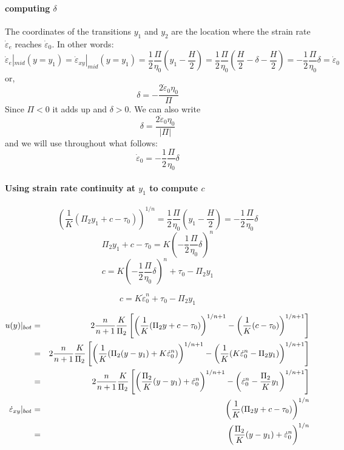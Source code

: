 \paragraph{computing $\delta$}

The coordinates of the transitions $y_1$ and $y_2$ are the location where the strain rate
$\dot{\varepsilon}_e$ reaches $\dot{\varepsilon}_0$. In other words:
\[
\dot{\varepsilon}_{e}|_{mid}(y=y_1) = 
\dot{\varepsilon}_{xy}|_{mid}(y=y_1)  
= \frac{1}{2} \frac{\Pi}{\eta_0} \left(y_1  -\frac{H}{2} \right)
= \frac{1}{2} \frac{\Pi}{\eta_0} \left(\frac{H}{2}-\delta  -\frac{H}{2} \right)
= -\frac{1}{2} \frac{\Pi}{\eta_0} \delta
= \dot{\varepsilon}_0
\]
or, 
\[
\delta = -\frac{2 \dot{\varepsilon}_0 \eta_0}{\Pi}
\]
Since $\Pi<0$ it adds up and $\delta>0$. We can also write
\[
\boxed{
\delta = \frac{2 \dot{\varepsilon}_0 \eta_0}{|\Pi|}
}
\]
and we will use throughout what follows:
\[
\dot{\varepsilon}_0 = - \frac{1}{2}\frac{\Pi}{\eta_0} \delta
\]


\paragraph{Using strain rate continuity at $y_1$ to compute $c$}
\[
\left( \frac{1}{K} ( \Pi_2 y_1 +c -\tau_0 ) \right)^{1/n}
= \frac{1}{2} \frac{\Pi}{\eta_0} \left(y_1  -\frac{H}{2} \right)
=- \frac{1}{2} \frac{\Pi}{\eta_0} \delta
\]
\[
 \Pi_2 y_1 +c -\tau_0 
= K\left( - \frac{1}{2} \frac{\Pi}{\eta_0} \delta\right)^{n}
\]
\[
c = K\left( - \frac{1}{2} \frac{\Pi}{\eta_0} \delta\right)^{n} + \tau_0 -\Pi_2 y_1
\]

\[
\boxed{
c = K \dot{\varepsilon}_0^{n} + \tau_0 -\Pi_2 y_1
}
\]




\begin{eqnarray}
u(y)|_{bot} 
&=& 
2 \frac{n}{n+1} \frac{K}{\Pi_2} \left[ \left( \frac{1}{K} ( \Pi_2 y +c -\tau_0 ) \right)^{1/n+ 1 } 
- \left( \frac{1}{K} ( c -\tau_0 ) \right)^{1/n+ 1 } \right]
\nonumber\\
&=& 2 \frac{n}{n+1} \frac{K}{\Pi_2} 
\left[ \left( \frac{1}{K} ( \Pi_2 (y-y_1) +K \dot{\varepsilon}_0^{n}   ) \right)^{1/n+ 1 } 
- \left( \frac{1}{K} (  K  
\dot{\varepsilon}_0^{n}  -\Pi_2 y_1    ) \right)^{1/n+ 1 } \right]
\nonumber\\
&=& 
2 \frac{n}{n+1} \frac{K}{\Pi_2} \left[ \left( \frac{\Pi_2}{K} (y-y_1) 
+ \dot{\varepsilon}_0^{n}    \right)^{1/n+ 1 } 
- \left(  \dot{\varepsilon}_0^{n}  - \frac{\Pi_2}{K}y_1     \right)^{1/n+ 1 } \right]
\nonumber\\
\dot{\varepsilon}_{xy}|_{bot}
&=& \left( \frac{1}{K} ( \Pi_2 y +c -\tau_0 ) \right)^{1/n} \nonumber\\
&=& \left( \frac{\Pi_2}{K} (y-y_1) + \dot{\varepsilon}_0^{n}   \right)^{1/n} \nonumber
\end{eqnarray}



